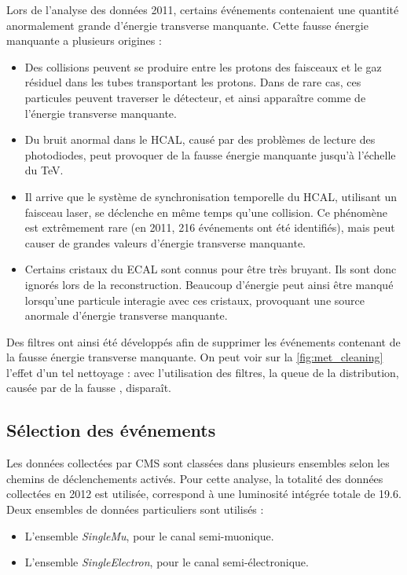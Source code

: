 Lors de l'analyse des données 2011, certains événements contenaient une quantité anormalement grande d'énergie transverse manquante. Cette fausse énergie manquante a plusieurs origines :
\begin{itemize}
  \item Des collisions peuvent se produire entre les protons des faisceaux et le gaz résiduel dans les tubes transportant les protons. Dans de rare cas, ces particules peuvent traverser le détecteur, et ainsi apparaître comme de l'énergie transverse manquante.
  \item Du bruit anormal dans le HCAL, causé par des problèmes de lecture des photodiodes, peut provoquer de la fausse énergie manquante jusqu'à l'échelle du \si{\TeV}.
  \item Il arrive que le système de synchronisation temporelle du HCAL, utilisant un faisceau laser, se déclenche en même temps qu'une collision. Ce phénomène est extrêmement rare (en 2011, 216 événements ont été identifiés), mais peut causer de grandes valeurs d'énergie transverse manquante.
  \item Certains cristaux du ECAL sont connus pour être très bruyant. Ils sont donc ignorés lors de la reconstruction. Beaucoup d'énergie peut ainsi être manqué lorsqu'une particule interagie avec ces cristaux, provoquant une source anormale d'énergie transverse manquante.
\end{itemize}

Des filtres ont ainsi été développés afin de supprimer les événements contenant de la fausse énergie transverse manquante. On peut voir sur la \cref{fig:met_cleaning} l'effet d'un tel nettoyage : avec l'utilisation des filtres, la queue de la distribution, causée par de la fausse \met, disparaît.

\subsection{Sélection des événements}

Les données collectées par CMS sont classées dans plusieurs ensembles selon les chemins de déclenchements activés. Pour cette analyse, la totalité des données collectées en 2012 est utilisée, correspond à une luminosité intégrée totale de \SI{19.6}{\invfb}. Deux ensembles de données particuliers sont utilisés :
\begin{itemize}
  \item L'ensemble \emph{SingleMu}, pour le canal semi-muonique.
  \item L'ensemble \emph{SingleElectron}, pour le canal semi-électronique.
\end{itemize}

